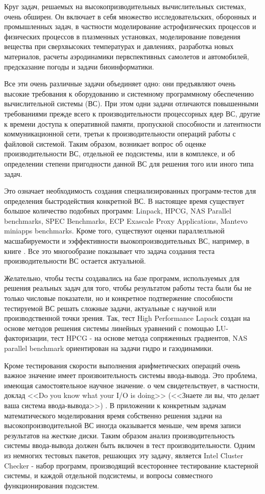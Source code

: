  Круг задач, решаемых на высокопризводительных вычислительных системах, очень обширен. Он включает в себя множество исследовательских, оборонных и промышленных задач, в частности моделирование астрофизических процессов и физических процессов в плазменных установках, моделирование поведения вещества при сверхвысоких температурах и давлениях, разработка новых материалов, расчеты аэродинамики первспективных самолетов и автомобилей, предсказание погоды и задачи биоинформатики.
 
 Все эти очень различные задачи объединяет одно: они предъявляют очень высокие требования к оборудованию и системному программному обеспечению вычислительной системы (ВС). При этом одни задачи  отличаются повышенными требованиями прежде всего к производительности процессорных ядер ВС, другие к времени доступа к оперативной памяти, пропускной способности и латентности коммуникационной сети, третьи к производительности операций работы с файловой системой. Таким образом, возникает вопрос об оценке производительности ВС, отдельной ее подсистемы, или в комплексе, и об определении степени пригодности данной ВС для решения того или иного типа задач. 
 
 Это означает необходимость создания специализированных программ-тестов для определения быстродействия конкретной ВС. В настоящее время существует большое количество подобных программ: Linpack, HPCG, NAS Parallel benchmarks, SPEC Benchmarks, ECP Exascale Proxy Applications, Mantevo miniapps benchmarks. Кроме того, существуют оценки параллелльной масшабируемости и ээффективности выокопроизводительных ВС, например, в книге \cite{StepanenkoScaling}.
 Все это многообразие показывает что задача создания теста производительности ВС остается актуальной.
 
 
 Желательно, чтобы тесты создавались на базе программ, используемых для решения реальных задач для того, чтобы результатом работы теста были бы не только числовые показатели, но и конкретное подтвержение способности тестируемой ВС решать сложные задачи, актуальные с научной или производственной точки зрения. Так, тест High Performance Lapack создан на основе методов решения системы линейных уравнений с помощью LU-факторизации, тест HPCG - на основе метода сопряженных градиентов, NAS parallel benchmark ориентирован на задачи гидро и газодинамики.
 
 
 
 Кроме тестирования скорости выполнения арифметических операций очень важное значение имеет произвоительность системы ввода-вывода. Это проблема, имеющая самостоятельное научное значение. о чем свидетельствует, в частности, доклад  <<Do you know what your I/O is doing>> (<<Знаете ли вы, что делает ваша система ввода-вывода>>) \cite{IOdoing}. В приложении к конкретным задачам математического моделирования время собственно решения задачи на высокопроизводительной ВС иногда оказывается меньше, чем время записи результатов на жесткие диски.
 Таким образом анализ производительность системы ввода-вывода должен быть включен в тест производительности.
 Одним из немногих тестовых пакетов, решающих эту задачу, является Intel Cluster Checker - набор программ, производящий всестороннее тестирование кластерной системы, и каждой отдельной подсистемы, и вопросы совместного функционирования подсистем. 
 
